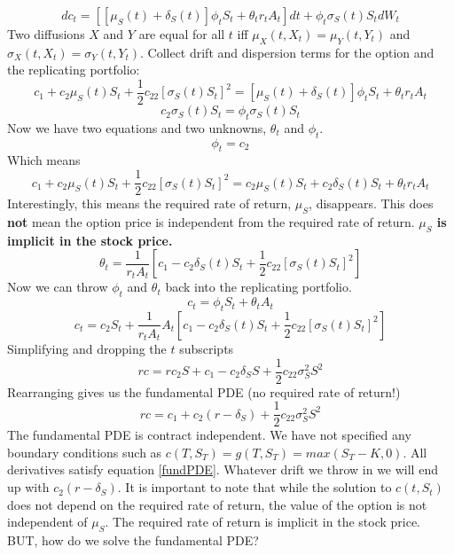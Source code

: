 \documentclass[12pt]{article}
\begin{document}
\begin{equation}
  dc_t= \left[ \left[ \mu_S(t) + \delta_S(t) \right] \phi_t S_t + \theta_t r_t
  A_t \right] dt + \phi_t \sigma_S(t)S_tdW_t
\end{equation}
Two diffusions $X$ and $Y$ are equal for all $t$ iff $\mu_X(t, X_t)=\mu_Y(t,
Y_t)$ and $\sigma_X(t, X_t)=\sigma_Y(t, Y_t)$. Collect drift and dispersion
terms for the option and the replicating portfolio:
\begin{equation}
  c_1+c_2\mu_S(t)S_t+\frac{1}{2}c_{22} \left[ \sigma_S(t)S_t \right] ^2 =
  \left[ \mu_S(t) + \delta_S(t) \right] \phi_t S_t + \theta_t r_t A_t
\end{equation}
\begin{equation}
  c_2\sigma_S(t)S_t=\phi_t\sigma_S(t)S_t
\end{equation}
Now we have two equations and two unknowns, $\theta_t$ and $\phi_t$.
\begin{equation}
\phi_t=c_2
\end{equation}
Which means
$$c_1+c_2\mu_S(t)S_t+\frac{1}{2}c_{22} \left[ \sigma_S(t)S_t \right] ^2 =
c_2\mu_S(t)S_t + c_2\delta_S(t)S_t + \theta_t r_t A_t$$
Interestingly, this means the required rate of return, $\mu_S$,
disappears. This does \textbf{not} mean the option price is independent from
the required rate of return. \textbf{$\mu_S$ is implicit in the stock price.}
\begin{equation}
  \theta_t=\frac{1}{r_t A_t} \left[ c_1 - c_2\delta_S(t)S_t + \frac{1}{2}
  c_{22} \left[ \sigma_S(t)S_t \right] ^2 \right]
\end{equation}
Now we can throw $\phi_t$ and $\theta_t$ back into the replicating portfolio.
$$c_t=\phi_tS_t+\theta_tA_t$$
\begin{equation}
  c_t=c_2S_t+\frac{1}{r_tA_t}A_t \left[ c_1-c_2\delta_S(t)S_t + \frac{1}{2}
  c_{22} \left[ \sigma_S(t)S_t \right] ^ 2 \right]
\end{equation}
Simplifying and dropping the $t$ subscripts
$$rc=rc_2S+c_1-c_2\delta_SS+\frac{1}{2}c_{22}\sigma_S^2S^2$$
Rearranging gives us the fundamental PDE (no required rate of return!)
\begin{equation} \label{fundPDE}
  rc=c_1+c_2 \left( r-\delta_S \right) +\frac{1}{2}c_{22}\sigma_S^2S^2
\end{equation}
The fundamental PDE is contract independent. We have not specified any
boundary conditions such as $c(T, S_T)=g(T, S_T)=max(S_T-K, 0)$. All
derivatives satisfy equation \ref{fundPDE}. Whatever drift we throw in we will
end up with $c_2(r-\delta_S)$. It is important to note that while
the solution to $c(t, S_t)$ does not depend on the required rate of return,
the value of the option is not independent of $\mu_S$. The required rate of
return is implicit in the stock price. BUT, how do we solve the fundamental
PDE?
\end{document}

